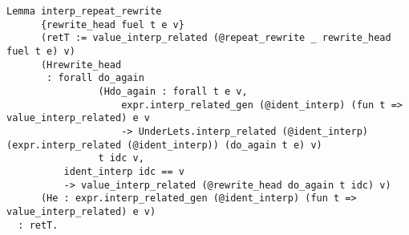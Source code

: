 \begin{itemize}
\begin{itemize}
\begin{itemize}
\begin{verbatim}
Lemma interp_repeat_rewrite
      {rewrite_head fuel t e v}
      (retT := value_interp_related (@repeat_rewrite _ rewrite_head fuel t e) v)
      (Hrewrite_head
       : forall do_again
                (Hdo_again : forall t e v,
                    expr.interp_related_gen (@ident_interp) (fun t => value_interp_related) e v
                    -> UnderLets.interp_related (@ident_interp) (expr.interp_related (@ident_interp)) (do_again t e) v)
                t idc v,
          ident_interp idc == v
          -> value_interp_related (@rewrite_head do_again t idc) v)
      (He : expr.interp_related_gen (@ident_interp) (fun t => value_interp_related) e v)
  : retT.
\end{verbatim}
    \end{itemize}
  \end{itemize}
\end{itemize}
